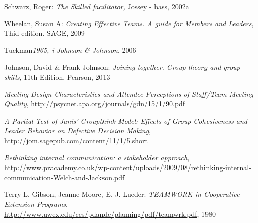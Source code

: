 \begin{thebibliography}{9}

  Schwarz, Roger: \emph{The Skilled facilitator,}
  Jossey - bass, 2002a

  Wheelan, Susan A: \emph{Creating Effective Teams. A guide for Members and Leaders}, Thid edition. SAGE, 2009

  Tuckman\emph{1965, i Johnson & Johnson}, 2006

  Johnson, David & Frank Johnson: \emph{Joining together. Group theory and group skills}, 11th Edition, Pearson, 2013

  \emph{Meeting Design Characteristics and Attendee Perceptions of Staff/Team Meeting Quality},
  \url{http://psycnet.apa.org/journals/gdn/15/1/90.pdf}

  \emph{A Partial Test of Janis' Groupthink Model: Effects of Group Cohesiveness and Leader Behavior on Defective Decision Making}, \url{http://jom.sagepub.com/content/11/1/5.short}


  \emph{Rethinking internal communication: a stakeholder approach}, \url{http://www.pracademy.co.uk/wp-content/uploads/2009/08/rethinking-internal-communication-Welch-and-Jackson.pdf}


  Terry L. Gibson, Jeanne Moore, E. J. Lueder: \emph{TEAMWORK in Cooperative Extension Programs}, \url{http://www.uwex.edu/ces/pdande/planning/pdf/teamwrk.pdf}, 1980

\end{thebibliography}